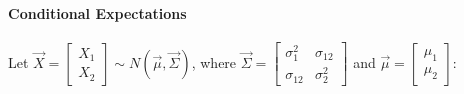 \documentclass[a4paper]{article}
\numberwithin{equation}{subsection}
\begin{document}
\paragraph{Conditional Expectations}
Let
\begin{math}
  \vec{X}=
  \begin{bmatrix}
    X_1\\
    X_2
  \end{bmatrix}
  \sim
  N(\vec{\mu}, \vec{\Sigma})
\end{math}, where
\begin{math}
\vec{\Sigma} = \left[
 \begin{array}{rr} \sigma_1^2 & \sigma_{12}\\ \sigma_{12} & \sigma_2^2
 \end{array}\right]
\end{math} and
\begin{math}
\vec{\mu}=\left[\begin{array}{r} \mu_1\\
 \mu_2\end{array}\right]
\end{math}:
\end{document}
